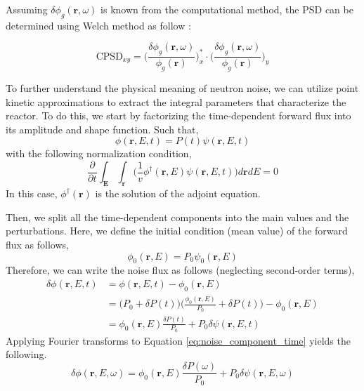 Assuming $\delta \phi_g (\textbf{r},\omega)$ is known from the computational method, the PSD can be determined using Welch method as follow \cite{mylonakisCORESIMSIMULATIONS2021}:

\begin{equation}
        \text{CPSD}_{xy} = \biggl(\frac{\delta \phi_{g}(\textbf{r}, \omega)}{\phi_{g}(\textbf{r})} \biggr)_x^* \cdot \biggl(\frac{\delta \phi_{g}(\textbf{r}, \omega)}{\phi_{g}(\textbf{r})} \biggr)_y
        \label{eq:CPSD_comp}
\end{equation}

To further understand the physical meaning of neutron noise, we can utilize point kinetic approximations to extract the integral parameters that characterize the reactor. To do this, we start by factorizing the time-dependent forward flux into its amplitude and shape function. Such that,
\begin{equation}
        \phi (\textbf{r}, E, t) = P(t) \psi (\textbf{r}, E, t)
\end{equation}
with the following normalization condition,
\begin{equation}\label{eq:normalization}
        \frac{\partial}{\partial t} \int_{\textbf{E}} \int_{\textbf{r}} \biggl( \frac{1}{v} \phi^{\dagger}(\textbf{r}, E) \psi (\textbf{r}, E, t) \biggr) d\textbf{r} dE = 0
\end{equation}
In this case, $\phi^{\dagger}(\textbf{r})$ is the solution of the adjoint equation. 

Then, we split all the time-dependent components into the main values and the perturbations. Here, we define the initial condition (mean value) of the forward flux as follows,
\begin{equation}
        \phi_0(\textbf{r}, E) = P_0 \psi_0 (\textbf{r}, E)
\end{equation}
Therefore, we can write the noise flux as follows (neglecting second-order terms),
\begin{equation}
        \begin{aligned}
                \delta \phi(\textbf{r}, E, t) &= \phi (\textbf{r}, E, t) - \phi_0(\textbf{r}, E)\\
                &= \biggl( P_0 + \delta P(t) \biggr) \biggl( \frac{\phi_0(\textbf{r}, E)}{P_0} + \delta P(t) \biggr) - \phi_0(\textbf{r}, E) \\
                &= \phi_0(\textbf{r}, E) \frac{ \delta P(t)}{P_0} + P_0 \delta \psi(\textbf{r}, E, t)
        \end{aligned}
        \label{eq:noise_component_time}
\end{equation}
Applying Fourier transforms to Equation \ref{eq:noise_component_time} yields the following.
\begin{equation}\label{eq:noise_component_freq}
        \delta \phi(\textbf{r}, E, \omega) = \phi_0(\textbf{r}, E) \frac{ \delta P(\omega)}{P_0} + P_0 \delta \psi(\textbf{r}, E, \omega)
\end{equation}

